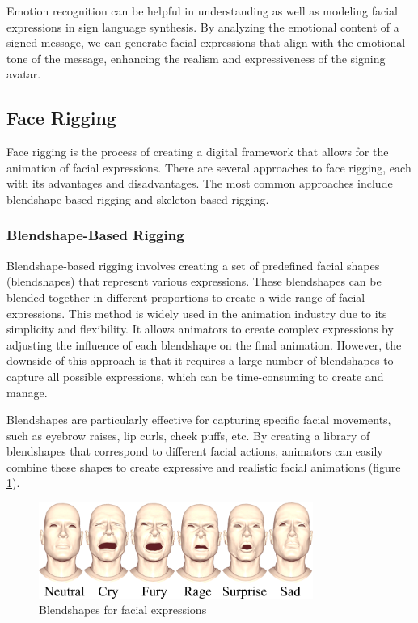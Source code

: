 \documentclass[../../main.tex]{subfiles}
\begin{document}
Emotion recognition can be helpful in understanding as well as modeling facial expressions in sign language synthesis. By analyzing the emotional content of a signed message, we can generate facial expressions that align with the emotional tone of the message, enhancing the realism and expressiveness of the signing avatar.

\subsection{Face Rigging}
\label{ch:facial_expressions:related_work:face_rigging}

Face rigging is the process of creating a digital framework that allows for the animation of facial expressions. There are several approaches to face rigging, each with its advantages and disadvantages. The most common approaches include blendshape-based rigging and skeleton-based rigging.

\subsubsection{Blendshape-Based Rigging}
\label{ch:facial_expressions:related_work:face_rigging:blendshape_based_rigging}

Blendshape-based rigging involves creating a set of predefined facial shapes (blendshapes) that represent various expressions. These blendshapes can be blended together in different proportions to create a wide range of facial expressions. This method is widely used in the animation industry due to its simplicity and flexibility. It allows animators to create complex expressions by adjusting the influence of each blendshape on the final animation. However, the downside of this approach is that it requires a large number of blendshapes to capture all possible expressions, which can be time-consuming to create and manage.

Blendshapes are particularly effective for capturing specific facial movements, such as eyebrow raises, lip curls, cheek puffs, etc. By creating a library of blendshapes that correspond to different facial actions, animators can easily combine these shapes to create expressive and realistic facial animations (figure \ref{fig:blendshapes}).

\begin{figure}
    \centering
    \includegraphics[width=0.8\textwidth]{chapters/facial_expressions/images/blendshapes.png}
    \caption{Blendshapes for facial expressions}
    \label{fig:blendshapes}
\end{figure}
\end{document}
